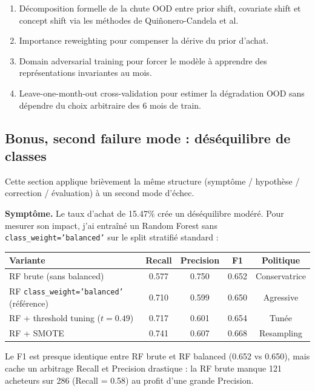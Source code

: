 \documentclass[11pt,a4paper]{article}
\newcommand{\code}[1]{\texttt{\small#1}}
\begin{document}
\begin{enumerate}
\item Décomposition formelle de la chute OOD entre prior shift, covariate shift et concept shift via les méthodes de Quiñonero-Candela et al.
\item Importance reweighting pour compenser la dérive du prior d'achat.
\item Domain adversarial training pour forcer le modèle à apprendre des représentations invariantes au mois.
\item Leave-one-month-out cross-validation pour estimer la dégradation OOD sans dépendre du choix arbitraire des 6 mois de train.
\end{enumerate}

\subsection*{Bonus, second failure mode : déséquilibre de classes}

Cette section applique brièvement la même structure (symptôme / hypothèse / correction / évaluation) à un second mode d'échec.

\textbf{Symptôme.} Le taux d'achat de 15.47\% crée un déséquilibre modéré. Pour mesurer son impact, j'ai entraîné un Random Forest sans \code{class\_weight='balanced'} sur le split stratifié standard :

\begin{center}
\begin{tabular}{lcccc}
\toprule
\textbf{Variante} & \textbf{Recall} & \textbf{Precision} & \textbf{F1} & \textbf{Politique} \\
\midrule
RF brute (sans balanced)        & 0.577 & 0.750 & 0.652 & Conservatrice \\
RF \code{class\_weight='balanced'} (référence)& 0.710 & 0.599 & 0.650 & Agressive \\
RF + threshold tuning ($t=0.49$)& 0.717 & 0.601 & 0.654 & Tunée \\
RF + SMOTE                      & 0.741 & 0.607 & 0.668 & Resampling \\
\bottomrule
\end{tabular}
\end{center}

Le F1 est presque identique entre RF brute et RF balanced (0.652 vs 0.650), mais cache un arbitrage Recall et Precision drastique : la RF brute manque 121 acheteurs sur 286 (Recall = 0.58) au profit d'une grande Precision.
\end{document}
